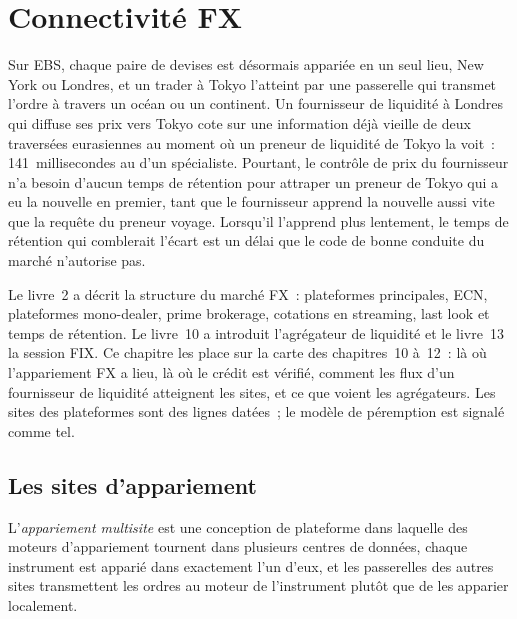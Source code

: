 \chapter{Connectivité FX}\label{ch:nw:fx-connectivity}

Sur EBS, chaque paire de devises est désormais appariée en un seul lieu, New York ou Londres, et un trader à Tokyo l'atteint par une passerelle
qui transmet l'ordre à travers un océan ou un continent. Un fournisseur de liquidité à Londres qui diffuse ses prix vers Tokyo cote sur
une information déjà vieille de deux traversées eurasiennes au moment où un preneur de liquidité de Tokyo la voit~: 141~millisecondes
au  d'un spécialiste. Pourtant, le contrôle de prix du fournisseur n'a besoin d'aucun temps de rétention pour attraper un preneur de Tokyo qui a eu la nouvelle en premier, tant que le fournisseur
apprend la nouvelle aussi vite que la requête du preneur voyage. Lorsqu'il l'apprend plus lentement, le temps de rétention qui comblerait l'écart est un délai
que le code de bonne conduite du marché n'autorise pas.

Le livre~2 a décrit la structure du marché FX~: plateformes principales, ECN, plateformes mono-dealer, prime brokerage, cotations en streaming,
last look et temps de rétention. Le livre~10 a introduit l'agrégateur de liquidité et le livre~13 la session FIX. Ce chapitre les place sur la
carte des chapitres~10 à~12~: là où l'appariement FX a lieu, là où le crédit est vérifié, comment les flux d'un fournisseur de liquidité atteignent
les sites, et ce que voient les agrégateurs. Les sites des plateformes sont des lignes datées~; le modèle de péremption est signalé comme tel.

\section{Les sites d'appariement}

\begin{definition}\label{def:nw:fx-connectivity:multisite}
L'\emph{appariement multisite} est une conception de plateforme dans laquelle des moteurs d'appariement tournent dans plusieurs centres de données,
chaque instrument est apparié dans exactement l'un d'eux, et les passerelles des autres sites transmettent les ordres au moteur de l'instrument
plutôt que de les apparier localement.
\end{definition}

